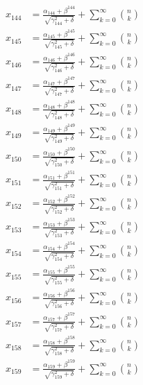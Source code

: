 \documentclass{article}
\begin{document}
\begin{align}
  x_{144} &= \frac{\alpha_{144} + \beta^{144}}{\sqrt{\gamma_{144}^2 + \delta}} + \sum_{k=0}^{\infty} \binom{n}{k} \label{eq:144} \\
  x_{145} &= \frac{\alpha_{145} + \beta^{145}}{\sqrt{\gamma_{145}^2 + \delta}} + \sum_{k=0}^{\infty} \binom{n}{k} \label{eq:145} \\
  x_{146} &= \frac{\alpha_{146} + \beta^{146}}{\sqrt{\gamma_{146}^2 + \delta}} + \sum_{k=0}^{\infty} \binom{n}{k} \label{eq:146} \\
  x_{147} &= \frac{\alpha_{147} + \beta^{147}}{\sqrt{\gamma_{147}^2 + \delta}} + \sum_{k=0}^{\infty} \binom{n}{k} \label{eq:147} \\
  x_{148} &= \frac{\alpha_{148} + \beta^{148}}{\sqrt{\gamma_{148}^2 + \delta}} + \sum_{k=0}^{\infty} \binom{n}{k} \label{eq:148} \\
  x_{149} &= \frac{\alpha_{149} + \beta^{149}}{\sqrt{\gamma_{149}^2 + \delta}} + \sum_{k=0}^{\infty} \binom{n}{k} \label{eq:149} \\
  x_{150} &= \frac{\alpha_{150} + \beta^{150}}{\sqrt{\gamma_{150}^2 + \delta}} + \sum_{k=0}^{\infty} \binom{n}{k} \label{eq:150} \\
  x_{151} &= \frac{\alpha_{151} + \beta^{151}}{\sqrt{\gamma_{151}^2 + \delta}} + \sum_{k=0}^{\infty} \binom{n}{k} \label{eq:151} \\
  x_{152} &= \frac{\alpha_{152} + \beta^{152}}{\sqrt{\gamma_{152}^2 + \delta}} + \sum_{k=0}^{\infty} \binom{n}{k} \label{eq:152} \\
  x_{153} &= \frac{\alpha_{153} + \beta^{153}}{\sqrt{\gamma_{153}^2 + \delta}} + \sum_{k=0}^{\infty} \binom{n}{k} \label{eq:153} \\
  x_{154} &= \frac{\alpha_{154} + \beta^{154}}{\sqrt{\gamma_{154}^2 + \delta}} + \sum_{k=0}^{\infty} \binom{n}{k} \label{eq:154} \\
  x_{155} &= \frac{\alpha_{155} + \beta^{155}}{\sqrt{\gamma_{155}^2 + \delta}} + \sum_{k=0}^{\infty} \binom{n}{k} \label{eq:155} \\
  x_{156} &= \frac{\alpha_{156} + \beta^{156}}{\sqrt{\gamma_{156}^2 + \delta}} + \sum_{k=0}^{\infty} \binom{n}{k} \label{eq:156} \\
  x_{157} &= \frac{\alpha_{157} + \beta^{157}}{\sqrt{\gamma_{157}^2 + \delta}} + \sum_{k=0}^{\infty} \binom{n}{k} \label{eq:157} \\
  x_{158} &= \frac{\alpha_{158} + \beta^{158}}{\sqrt{\gamma_{158}^2 + \delta}} + \sum_{k=0}^{\infty} \binom{n}{k} \label{eq:158} \\
  x_{159} &= \frac{\alpha_{159} + \beta^{159}}{\sqrt{\gamma_{159}^2 + \delta}} + \sum_{k=0}^{\infty} \binom{n}{k} \label{eq:159} \\

\end{align}
\end{document}
